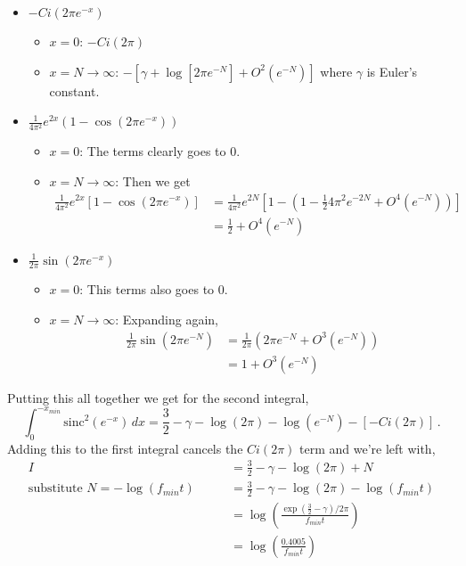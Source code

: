 \documentclass{article}
\begin{document}
\begin{itemize}

\item $-Ci(2\pi e^{-x})$
\begin{itemize}
\item $x=0$: $-Ci(2\pi)$ 
\item $x=N\rightarrow\infty$: $-\left[\gamma+\log\left[2\pi e^{-N}\right]+O^{2}(e^{-N})\right]$
where $\gamma$ is Euler's constant. 
\end{itemize}

\item $\frac{1}{4\pi^{2}}e^{2x}\left(1-\cos(2\pi e^{-x})\right)$
\begin{itemize}
\item $x=0$: The terms clearly goes to 0. 
\item $x=N\rightarrow\infty$: Then we get
\begin{align*}
\frac{1}{4\pi^{2}}e^{2x}\left[1-\cos\left(2\pi e^{-x}\right)\right]
& = \frac{1}{4\pi^{2}}e^{2N}\left[1-\left(1-\frac{1}{2}4\pi^{2}e^{-2N}+O^{4}(e^{-N})\right)\right] \\
&= \frac{1}{2}+O^{4}(e^{-N})
\end{align*}
\end{itemize}

\item $\frac{1}{2\pi}\sin\left(2\pi e^{-x}\right)$
\begin{itemize}
\item $x=0$: This terms also goes to 0. 
\item $x=N\rightarrow\infty$: Expanding again,
\begin{align*}
\frac{1}{2\pi}\sin\left(2\pi e^{-N}\right) &= \frac{1}{2\pi}\left(2\pi e^{-N}+O^{3}(e^{-N})\right) \\
& = 1+O^{3}(e^{-N})
\end{align*}
\end{itemize}
\end{itemize}
Putting this all together we get for the second integral,
\begin{equation}
\int_{0}^{-x_{min}}\textrm{sinc}^{2}\left(e^{-x}\right)\, dx=\frac{3}{2}-\gamma-\log\left(2\pi\right)-\log\left(e^{-N}\right)-\left[-Ci\left(2\pi\right)\right] \, .
\end{equation}
Adding this to the first integral cancels the $Ci(2\pi)$ term and
we're left with,
\begin{align}
I & = \frac{3}{2}-\gamma-\log\left(2\pi\right) + N \\
\textrm{substitute } N = -\log\left(f_{min}t\right) \qquad
& = \frac{3}{2}-\gamma-\log\left(2\pi\right)-\log\left(f_{min}t\right) \\
& = \log\left(\frac{\exp(\frac{3}{2}-\gamma)/2\pi}{f_{min}t}\right)\\
& = \log\left(\frac{0.4005}{f_{min}t}\right)
\end{align}
\end{document}
